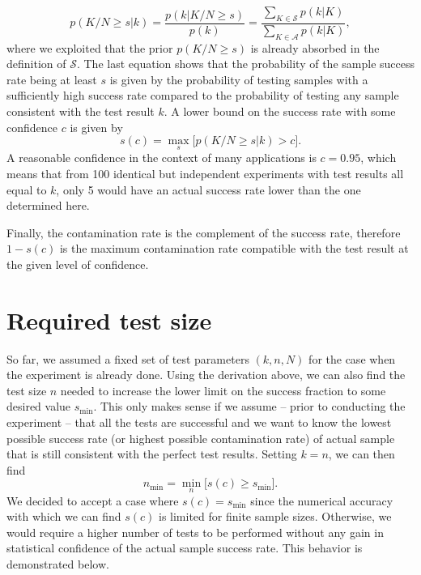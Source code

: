 \documentclass[11pt]{scrartcl}
\begin{document}
\begin{equation}
p(K/N\geq s | k) = \frac{p(k | K/N\geq s)}{p(k)} = \frac{\sum_{K\in \mathcal{S}} p(k | K)}{\sum_{K\in \mathcal{A}} p(k | K)},
\end{equation}
where we exploited that the prior $p(K/N\geq s)$ is already absorbed in the definition of $\mathcal{S}$. The last equation shows that the probability of the sample success rate being at least $s$ is given by  the probability of testing samples with a sufficiently high success rate compared to the probability of testing any sample consistent with the test result $k$. A lower bound on the success rate with some confidence $c$ is given by
\begin{equation}
s(c) = \max_s \big[p(K/N\geq s | k) > c\big].
\end{equation}
A reasonable confidence in the context of many applications is $c=0.95$, which means that from 100 identical but independent experiments with test results all equal to $k$, only 5 would have an actual success rate lower than the one determined here.

Finally, the contamination rate is the complement of the success rate, therefore $1-s(c)$ is the maximum contamination rate compatible with the test result at the given level of confidence.

\section*{Required test size}
So far, we assumed a fixed set of test parameters $(k,n,N)$ for the case when the experiment is already done. Using the derivation above, we can also find the test size $n$ needed to increase the lower limit on the success fraction to some desired value $s_\textrm{min}$. This only makes sense if we assume -- prior to conducting the experiment -- that all the tests are successful and we want to know the lowest possible success rate (or highest possible contamination rate) of actual sample that is still consistent with the perfect test results. Setting $k=n$, we can then find
\begin{equation}
n_\textrm{min} = \min_n \big[ s(c) \geq s_\textrm{min} \big].
\end{equation}
We decided to accept a case where $s(c) = s_\textrm{min}$ since the numerical accuracy with which we can find $s(c)$ is limited for finite sample sizes. Otherwise, we would require a higher number of tests to be performed without any gain in statistical confidence of the actual sample success rate. This behavior is demonstrated below.
\end{document}
